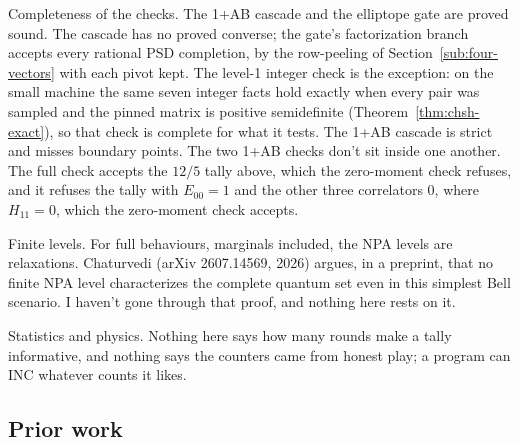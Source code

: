 \documentclass[11pt,twoside]{article}
\theoremstyle{thielethm}
\theoremstyle{thieledef}
\theoremstyle{thieledef}
\theoremstyle{thieledef}
\theoremstyle{thielethm}
\theoremstyle{thieleobs}
\theoremstyle{thielethm}
\begin{document}
Completeness of the checks. The 1+AB cascade and the elliptope gate are proved sound. The cascade has no proved converse; the gate's factorization branch accepts every rational PSD completion, by the row-peeling of Section~\ref{sub:four-vectors} with each pivot kept. The level-1 integer check is the exception: on the small machine the same
seven integer facts hold exactly when every pair was sampled and the pinned matrix is positive
semidefinite (Theorem~\ref{thm:chsh-exact}), so that check is
complete for what it tests. The 1+AB cascade is strict and misses boundary points.
The two 1+AB checks don't sit inside one another. The full check accepts the $12/5$ tally above, which the zero-moment check refuses, and it refuses the tally with $E_{00}=1$ and the other three correlators 0, where $H_{11}=0$, which the zero-moment check accepts.

Finite levels. For full behaviours, marginals included, the NPA levels are relaxations.
Chaturvedi (arXiv 2607.14569, 2026) argues, in a preprint, that no finite NPA level characterizes the complete
quantum set even in this simplest Bell scenario. I haven't gone through that proof, and nothing
here rests on it.

Statistics and physics. Nothing here says how many rounds make a tally informative, and
nothing says the counters came from honest play; a program can INC whatever counts it likes.

\subsection{Prior work}
\end{document}
